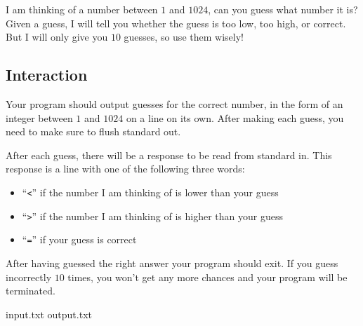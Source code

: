 
I am thinking of a number between $1$ and $1024$, can you guess what
number it is?  Given a guess, I will tell you whether the guess is too
low, too high, or correct.  But I will only give you $10$ guesses, so
use them wisely!

\subsection*{Interaction}

Your program should output guesses for the correct number, in the form
of an integer between $1$ and $1024$ on a line on its own.  After
making each guess, you need to make sure to flush standard out.

After each guess, there will be a response to be read from standard
in.  This response is a line with one of the following three words:
\begin{itemize}
\item ``\texttt{<}'' if the number I am thinking of is lower than your guess
\item ``\texttt{>}'' if the number I am thinking of is higher than your guess
\item ``\texttt{=}'' if your guess is correct
\end{itemize}
After having guessed the right answer your program should exit.  If
you guess incorrectly $10$ times, you won't get any more chances and
your program will be terminated.

\vspace{0.4cm}
\sampletable
  {\sampleinputname{} \if@samplenumbers\sampleid\fi}{input.txt}
  {\sampleoutputname{} \if@samplenumbers\sampleid\fi}{output.txt}
